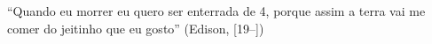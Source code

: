 \begin{epigrafe}
    \vspace*{\fill}
{%
	\noindent\hspace{.5\textwidth}
	{\begin{minipage}{.5\textwidth}
		\begin{flushright}
			``Quando eu morrer eu quero ser enterrada de 4, porque assim a terra vai me comer do jeitinho que eu gosto'' (Edison, [19--])
		\end{flushright}
	\end{minipage}}%
	\vspace*{3cm}
}%
\end{epigrafe}

